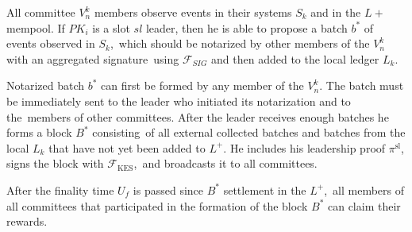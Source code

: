 \begin{legal}
    \item All committee $V^k_n$ members observe events in their systems $S_k$ and in the $L+$ mempool.
    If $PK_i$ is a slot $sl$ leader, then he is able to propose a batch $b^*$ of events observed in $S_k$,\
    which should be notarized by other members of the $V^k_n$ with an aggregated signature\
    using ${\mathcal{F}}_{SIG}$ and then added to the local ledger $L_k$.

    \item Notarized batch $b^*$ can first be formed by any member of the $V^k_n$.
    The batch must be immediately sent to the leader who initiated its notarization and to the\
    members of other committees.
    After the leader receives enough batches he forms a block  $B^*$ consisting\
    of all external collected batches and batches from the local $L_k$ that have not yet been added to $L^+$.
    He includes his leadership proof $\pi^{\text{sl}}$, signs the block with ${\mathcal{F}}_{\text{KES}}$,\
    and broadcasts it to all committees.

    \item After the finality time $U_f$ is passed since $B^*$ settlement in the $L^+$,\
    all members of all committees that participated in the formation of the block $B^*$ can claim their rewards.

\end{legal}

